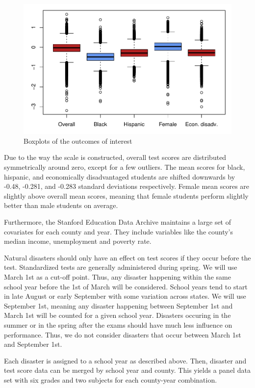 \begin{figure}[!h]
	\centering
	\includegraphics[scale=1]{"../Code & Data/DepVarsBoxplot.pdf"}
	\caption{Boxplots of the outcomes of interest}
	\label{DepVarsBoxplot}
\end{figure}

Due to the way the scale is constructed, overall test scores are distributed symmetrically around zero, except for a few outliers. The mean scores for black, hispanic, and economically disadvantaged students are shifted downwards by -0.48, -0.281, and -0.283 standard deviations respectively. Female mean scores are slightly above overall mean scores, meaning that female students perform slightly better than male students on average.

Furthermore, the Stanford Education Data Archive maintains a large set of covariates for each county and year. They include variables like the county's median income, unemployment and poverty rate.

Natural disasters should only have an effect on test scores if they occur before the test. Standardized tests are generally administered during spring. We will use March 1st as a cut-off point. Thus, any disaster happening within the same school year before the 1st of March will be considered. School years tend to start in late August or early September with some variation across states. We will use September 1st, meaning any disaster happening between September 1st and March 1st will be counted for a given school year. Disasters occuring in the summer or in the spring after the exams should have much less influence on performance. Thus, we do not consider disasters that occur between March 1st and September 1st.

Each disaster is assigned to a school year as described above. Then, disaster and test score data can be merged by school year and county. This yields a panel data set with six grades and two subjects for each county-year combination.








